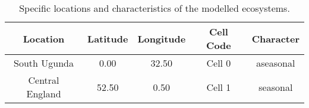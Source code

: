 \begin{table}[t!]
\centering
\caption[Specific locations and characteristics of the modelled ecosystems]{Specific locations and characteristics of the modelled ecosystems.} 
\label{tab:mat:exp:loc}
\begin{tabular*}{\textwidth}{@{\extracolsep{\fill} } ccccc}
  \toprule
\textbf{Location} & \textbf{Latitude} & \textbf{Longitude} & \textbf{Cell Code} & \textbf{Character} \\ 
  \midrule
South Ugunda & 0.00 & 32.50 & Cell 0 & aseasonal \\ 
  Central England & 52.50 & 0.50 & Cell 1 & seasonal \\ 
   \bottomrule
\end{tabular*}
\end{table}
